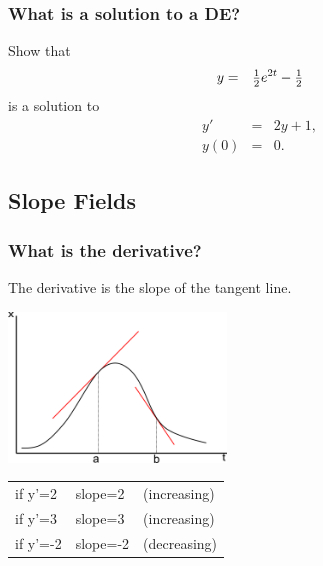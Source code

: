 \begin{frame}
  \frametitle{What is a solution to a DE?}

  Show that 
  \begin{eqnarray*}
    y & = & \mbox{$\frac{1}{2}$} e^{2t} - \mbox{$\frac{1}{2}$}
  \end{eqnarray*}
  is a solution to
  \begin{eqnarray*}
    y' & = & 2y + 1, \\
    y(0) & = & 0.
  \end{eqnarray*}




\end{frame}


\subsection{Slope Fields}

\begin{frame}
  \frametitle{What is the derivative?}

  The derivative is the slope of the tangent line.

  \vfill
  \includegraphics[height=4cm]{img/simpleSlope}
  \vfill

  \begin{tabular}{lll}
    if y'=2 & slope=2   & (increasing) \\
    if y'=3 & slope=3   & (increasing) \\
    if y'=-2 & slope=-2 & (decreasing) \\
  \end{tabular}


\end{frame}



